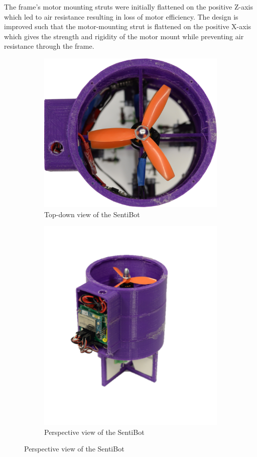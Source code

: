 \documentclass[12pt]{article}
\begin{document}
The frame's motor mounting struts were initially flattened on the positive Z-axis which led to air resistance resulting in loss of motor efficiency. The design is improved such that the motor-mounting strut is flattened on the positive X-axis which gives the strength and rigidity of the motor mount while preventing air resistance through the frame.

\begin{figure}
	\centering
	\begin{subfigure}{0.5\textwidth}
		\centering
		\includegraphics[width=0.9\linewidth]{sb-topdown.png}
		\caption{Top-down view of the SentiBot}
		\label{fig:sb-topdown}
	\end{subfigure}%
	\begin{subfigure}{0.5\textwidth}
		\centering
		\includegraphics[width=0.9\linewidth]{sb-side.png}
	\caption{Perspective view of the SentiBot}
	\label{fig:sb-side}
	\end{subfigure}
\end{figure}
\end{document}
